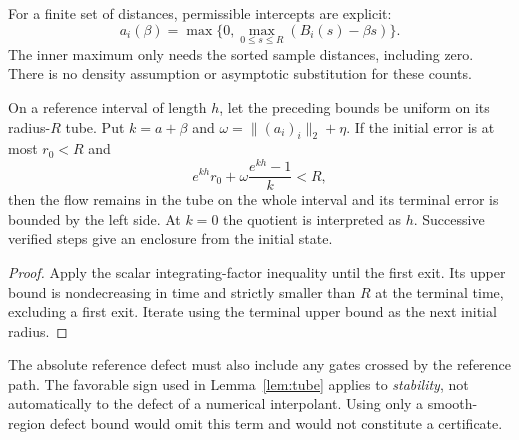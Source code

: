 For a finite set of distances, permissible intercepts are explicit:
\[
 a_i(\beta)=\max\big\{0,\max_{0\le s\le R}(B_i(s)-\beta s)\big\}.
\]
The inner maximum only needs the sorted sample distances, including zero.
There is no density assumption or asymptotic substitution for these counts.

\begin{corollary}\label{cor:tube-step}
On a reference interval of length $h$, let the preceding bounds be uniform
on its radius-$R$ tube. Put $k=a+\beta$ and
$\omega=\|(a_i)_i\|_2+\eta$. If the initial error is at most $r_0<R$ and
\[
 e^{kh}r_0+\omega\frac{e^{kh}-1}{k}<R,
\]
then the flow remains in the tube on the whole interval and its terminal
error is bounded by the left side. At $k=0$ the quotient is interpreted as
$h$. Successive verified steps give an enclosure from the initial state.
\end{corollary}
\begin{proof}
Apply the scalar integrating-factor inequality until the first exit. Its
upper bound is nondecreasing in time and strictly smaller than $R$ at the
terminal time, excluding a first exit. Iterate using the terminal upper bound
as the next initial radius.
\end{proof}
The absolute reference defect must also include any gates crossed by the
reference path. The favorable sign used in Lemma~\ref{lem:tube} applies to
\emph{stability}, not automatically to the defect of a numerical interpolant.
Using only a smooth-region defect bound would omit this term and would not
constitute a certificate.

